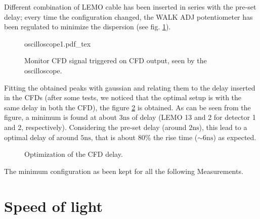 \documentclass[11pt,a4 paper]{article}
\begin{document}
Different combination of LEMO cable has been inserted in series with the pre-set delay; every time the configuration changed, the WALK ADJ potentiometer has been regulated to minimize the dispersion (see fig. \ref{fig:oscilloscope}).

\begin{figure}[H]
    \centering
    \def\svgwidth{0.7\textwidth}{oscilloscope1.pdf_tex}
    \caption{Monitor CFD signal triggered on CFD output, seen by the oscilloscope.}
    \label{fig:oscilloscope}
\end{figure}


Fitting the obtained peaks with gaussian and relating them to the delay inserted in the CFDs (after some tests, we noticed that the optimal setup is with the same delay in both the CFD), the figure \ref{fig:CFD:delay} is obtained. As can be seen from the figure, a minimum is found at about $3\si{\nano\second}$ of delay (LEMO 13 and 2 for detector 1 and 2, respectively). Considering the pre-set delay (around $2\si{\nano\second}$), this lead to a optimal delay of around $5\si{\nano\second}$, that is about $80\%$ the rise time ($\sim6\si{\nano\second}$) as expected.

\begin{figure}[H]
    \centering
    \caption{Optimization of the CFD delay.}
    \label{fig:CFD:delay}
\end{figure}

The minimum configuration as been kept for all the following Measurements.

\section{Speed of light}
\end{document}
